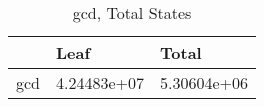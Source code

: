\begin{table}
\centering
\caption{gcd, Total States}
\label{gcd_total}
\begin{tabular}{lll}
\toprule
{} &         Leaf &        Total \\
\midrule
gcd &  4.24483e+07 &  5.30604e+06 \\
\bottomrule
\end{tabular}
\end{table}
